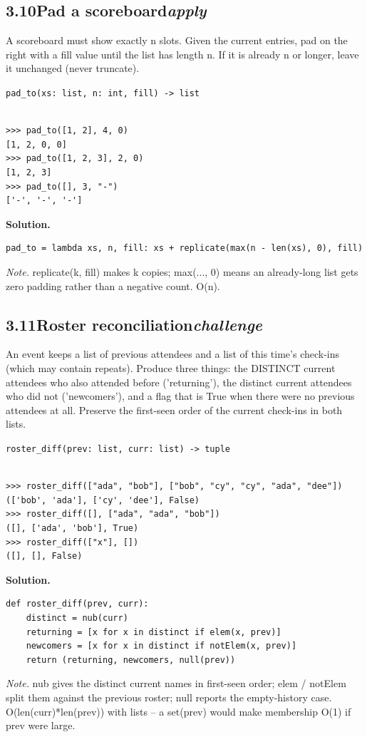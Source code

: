\documentclass[10pt,letterpaper]{book}
\begin{document}
\subsection*{3.10\quad Pad a scoreboard\hfill\textnormal{\textit{apply}}}
A scoreboard must show exactly n slots. Given the current entries, pad on the right with a fill value until the list has length n. If it is already n or longer, leave it unchanged (never truncate).

\noindent\texttt{pad\_to(xs: list, n: int, fill) -> list}
\begin{lstlisting}[style=ex]

>>> pad_to([1, 2], 4, 0)
[1, 2, 0, 0]
>>> pad_to([1, 2, 3], 2, 0)
[1, 2, 3]
>>> pad_to([], 3, "-")
['-', '-', '-']

\end{lstlisting}
\noindent\textbf{Solution.}
\begin{lstlisting}[style=code]
pad_to = lambda xs, n, fill: xs + replicate(max(n - len(xs), 0), fill)
\end{lstlisting}
\noindent\textit{Note.} replicate(k, fill) makes k copies; max(..., 0) means an already-long list gets zero padding rather than a negative count. O(n).

\subsection*{3.11\quad Roster reconciliation\hfill\textnormal{\textit{challenge}}}
An event keeps a list of previous attendees and a list of this time's check-ins (which may contain repeats). Produce three things: the DISTINCT current attendees who also attended before ('returning'), the distinct current attendees who did not ('newcomers'), and a flag that is True when there were no previous attendees at all. Preserve the first-seen order of the current check-ins in both lists.

\noindent\texttt{roster\_diff(prev: list, curr: list) -> tuple}
\begin{lstlisting}[style=ex]

>>> roster_diff(["ada", "bob"], ["bob", "cy", "cy", "ada", "dee"])
(['bob', 'ada'], ['cy', 'dee'], False)
>>> roster_diff([], ["ada", "ada", "bob"])
([], ['ada', 'bob'], True)
>>> roster_diff(["x"], [])
([], [], False)

\end{lstlisting}
\noindent\textbf{Solution.}
\begin{lstlisting}[style=code]
def roster_diff(prev, curr):
    distinct = nub(curr)
    returning = [x for x in distinct if elem(x, prev)]
    newcomers = [x for x in distinct if notElem(x, prev)]
    return (returning, newcomers, null(prev))
\end{lstlisting}
\noindent\textit{Note.} nub gives the distinct current names in first-seen order; elem / notElem split them against the previous roster; null reports the empty-history case. O(len(curr)*len(prev)) with lists -- a set(prev) would make membership O(1) if prev were large.
\end{document}
